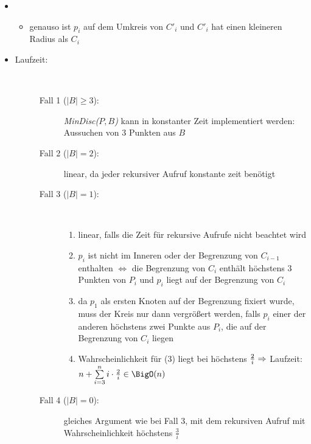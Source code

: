 \topbreak\up\up
\begin{itemize}
	\item[] \begin{itemize}
		\item genauso ist $p_i$ auf dem Umkreis von $C'_i$ und $C'_i$ hat einen kleineren Radius als $C_i$\\
		\scalebox{0.9}{}
	\end{itemize}
	\item \begin{description}
		\item[Laufzeit:] \ \\\up
			\begin{description}
				\item[Fall 1 ($|B|\geq 3$):] \textit{MinDisc($P,B$)} kann in konstanter Zeit implementiert werden: Aussuchen von 3 Punkten aus $B$
				\item[Fall 2 ($|B|= 2$):] linear, da jeder rekursiver Aufruf konstante zeit benötigt
				\item[Fall 3 ($|B|=1$):]\ \\\up
					\begin{enumerate}
						\item linear, falls die Zeit für rekursive Aufrufe nicht beachtet wird
						\item $p_i$ ist nicht im Inneren oder der Begrenzung von $C_{i-1}$ enthalten $\Longleftrightarrow $ die Begrenzung von $C_i$ enthält höchstens $3$ Punkten von $P_i$ und $p_i$ liegt auf der Begrenzung von $C_i$
						\item da $p_1$ als ersten Knoten auf der Begrenzung fixiert wurde, muss der Kreis nur dann vergrößert werden, falls $p_i$ einer der anderen höchstens zwei Punkte aus $P_i$, die auf der Begrenzung von $C_i$ liegen
						\item Wahrscheinlichkeit für (3) liegt bei höchstens $\frac{2}{i}\\
						\Rightarrow$ Laufzeit: $n+\sum\limits_{i=3}^{n}i\cdot \frac{2}{i}\in \BigO(n)$
					\end{enumerate}
				\item[Fall 4 ($|B|=0$):] gleiches Argument wie bei Fall 3, mit dem rekursiven Aufruf mit Wahrscheinlichkeit höchstens $\frac{3}{i}$
			\end{description}
	\end{description}
\end{itemize}
